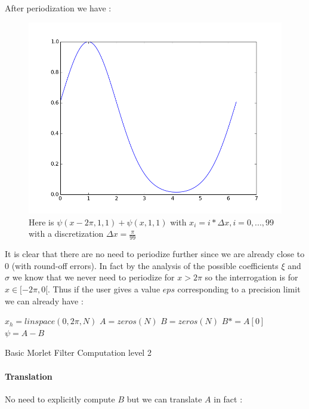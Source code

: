 \documentclass[a4paper]{report}
\begin{document}
After periodization we have :

\begin{figure}[H]
\begin{center}
\includegraphics[scale=0.31]{f_x_1_1_1_perio.png}\caption{Here is $\psi(x-2\pi,1,1)+\psi(x,1,1)$ with $x_i=i*\Delta x,i=0,...,99$ with a discretization $\Delta x=\frac{\pi}{99}$}
\end{center}
\end{figure}

It is clear that there are no need to periodize further since we are already close to $0$ (with round-off errors). In fact by the analysis of the possible coefficients $\xi$ and $\sigma$ we know that we never need to periodize for $x>2\pi$ so the interrogation is for $x \in [-2\pi,0[$. Thus if the user gives a value $eps$ corresponding to a precision limit we can already have :

\begin{algorithm}[H]
 \KwData{$\xi$, $\sigma$, $\epsilon$}
 \KwResult{$\psi$}
 $x_h=linspace(0,2\pi,N)$\;
 $A=zeros(N)$\;
 $B=zeros(N)$\;
  {
  }
  $B*=A[0]$
  $\psi= A-B$
 \caption{Basic Morlet Filter Computation level 2}
\end{algorithm}

\paragraph{Translation}
No need to explicitly compute $B$ but we can translate $A$ in fact :
\end{document}
